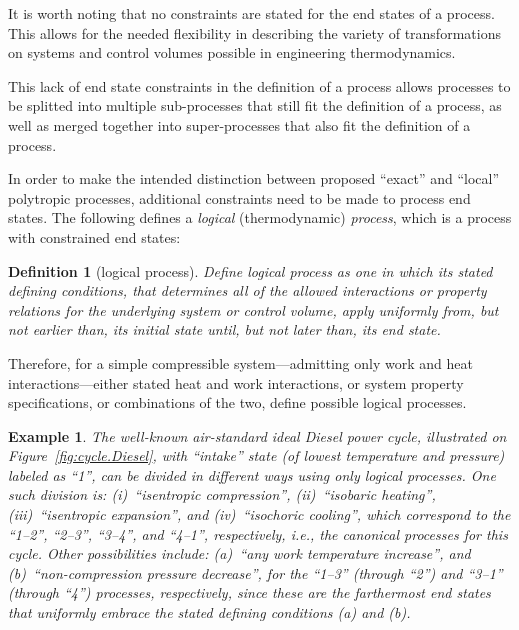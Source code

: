 \documentclass[fleqn,10pt]{SelfArx}
\newtheorem{definition}{Definition}
\newtheorem{example}{Example}
\begin{document}
    It is worth noting that no constraints are stated for the end  states  of  a  process.  This
    allows for the needed flexibility in describing the variety of  transformations  on  systems
    and control volumes possible in engineering thermodynamics.

    This lack of end state constraints in the definition of a process  allows  processes  to  be
    splitted into multiple sub-processes that still fit the definition of a process, as well as
    merged together into super-processes that also fit the definition of a process.

    In order  to  make  the  intended  distinction  between  proposed  ``exact''  and  ``local''
    polytropic processes, additional constraints need to be made  to  process  end  states.  The
    following defines a \emph{logical} (thermodynamic) \emph{process}, which is a  process  with
    constrained end states:

    \begin{definition}[logical process]\label{def:logical.proc}
        Define logical process as one in which its stated defining conditions,  that  determines
        all of the allowed interactions or property  relations  for  the  underlying  system  or
        control volume, apply uniformly from, but not earlier than, its initial state until, but
        not later than, its end state.
    \end{definition}

    Therefore,   for   a   simple   compressible   system---admitting   only   work   and   heat
    interactions---either stated heat and work interactions, or system property  specifications,
    or combinations of the two, define possible logical processes.

    \begin{example}\label{ex:ideal.Diesel}
        The   well-known   air-standard   ideal   Diesel    power    cycle,    illustrated    on
        Figure~\ref{fig:cycle.Diesel},  with  ``intake''  state  (of  lowest   temperature   and
        pressure) labeled as ``1'',  can  be  divided  in  different  ways  using  only  logical
        processes.  One  such  division  is:  (i)~``isentropic  compression'',   (ii)~``isobaric
        heating'',  (iii)~``isentropic  expansion'',  and  (iv)~``isochoric   cooling'',   which
        correspond to the ``1--2'', ``2--3'', ``3--4'', and ``4--1'',  respectively,  i.e.,  the
        canonical  processes  for  this  cycle.  Other  possibilities  include:  (a)~``any  work
        temperature increase'', and (b)~``non-compression pressure decrease'', for the  ``1--3''
        (through ``2'') and ``3--1'' (through ``4'') processes, respectively,  since  these  are
        the farthermost end states that uniformly embrace the stated defining conditions (a) and
        (b).
    \end{example}
\end{document}

